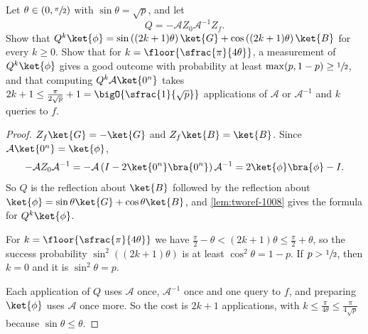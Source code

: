 \begin{exercisebox}
\begin{exercise}\label{ex:ampamp-1008}\label{thm:ampamp-1008}
    Let $\theta \in (0, \sfrac{\pi}{2})$ with $\sin\theta = \sqrt{p}$, and let
    \[Q = -\mathcal{A} Z_0 \mathcal{A}^{-1} Z_f.\]
    Show that
    $Q^k\ket{\phi} = \sin\left((2k+1)\theta\right)\ket{G} + \cos\left((2k+1)\theta\right)\ket{B}$
    for every $k \geq 0$. Show that for $k = \floor{\sfrac{\pi}{4\theta}}$, a measurement of
    $Q^k\ket{\phi}$ gives a good outcome with probability at least $\max(p, 1 - p) \geq \sfrac{1}{2}$,
    and that computing $Q^k \mathcal{A}\ket{0^n}$ takes
    $2k + 1 \leq \frac{\pi}{2\sqrt{p}} + 1 = \bigO{\sfrac{1}{\sqrt{p}}}$ applications of $\mathcal{A}$ or
    $\mathcal{A}^{-1}$ and $k$ queries to $f$.
\end{exercise}
\tcblower
\begin{proof}
    $Z_f\ket{G} = -\ket{G}$ and $Z_f\ket{B} = \ket{B}$. Since $\mathcal{A}\ket{0^n} = \ket{\phi}$,
    \[-\mathcal{A} Z_0 \mathcal{A}^{-1} = -\mathcal{A}\left(I - 2\ket{0^n}\bra{0^n}\right)\mathcal{A}^{-1}
        = 2\ket{\phi}\bra{\phi} - I.\]
    So $Q$ is the reflection about $\ket{B}$ followed by the reflection about
    $\ket{\phi} = \sin\theta\ket{G} + \cos\theta\ket{B}$, and \cref{lem:tworef-1008} gives the formula
    for $Q^k\ket{\phi}$.

    For $k = \floor{\sfrac{\pi}{4\theta}}$ we have
    $\frac{\pi}{2} - \theta < (2k+1)\theta \leq \frac{\pi}{2} + \theta$, so the success probability
    $\sin^2((2k+1)\theta)$ is at least $\cos^2\theta = 1 - p$. If $p > \sfrac{1}{2}$, then $k = 0$ and
    it is $\sin^2\theta = p$.

    Each application of $Q$ uses $\mathcal{A}$ once, $\mathcal{A}^{-1}$ once and one query to $f$, and
    preparing $\ket{\phi}$ uses $\mathcal{A}$ once more. So the cost is $2k + 1$ applications, with
    $k \leq \frac{\pi}{4\theta} \leq \frac{\pi}{4\sqrt{p}}$ because $\sin\theta \leq \theta$.
\end{proof}
\end{exercisebox}
